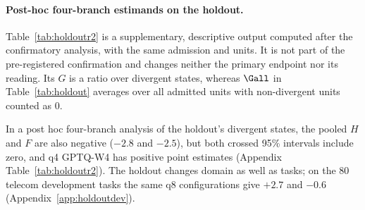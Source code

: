 \paragraph{Post-hoc four-branch estimands on the holdout.} Table~\ref{tab:holdoutr2} is a supplementary, descriptive output computed after the confirmatory analysis, with the same admission and units. It is not part of the pre-registered confirmation and changes neither the primary endpoint nor its reading. Its $G$ is a ratio over divergent states, whereas $\Gall$ in Table~\ref{tab:holdout} averages over all admitted units with non-divergent units counted as 0. %

In a post hoc four-branch analysis of the holdout's divergent states, the pooled $H$ and $F$ are also negative ($-2.8$ and $-2.5$\pp{}), but both crossed 95\% intervals include zero, and q4 GPTQ-W4 has positive point estimates (Appendix Table~\ref{tab:holdoutr2}). The holdout changes domain as well as tasks; on the 80 telecom development tasks the same q8 configurations give $+2.7$ and $-0.6$\pp{} (Appendix~\ref{app:holdoutdev}). %

\begin{table}[t]
\centering\scriptsize\setlength{\tabcolsep}{3pt}
\caption{Telecom holdout, \emph{post-hoc} four-branch estimands on divergent states (descriptive; not part of the pre-registered confirmation). pp; crossed task$\times$block 95\% intervals; pool weights as pre-registered; mean $I$ as in Table~\ref{tab:ghf}.}
\label{tab:holdoutr2}
\end{table}

